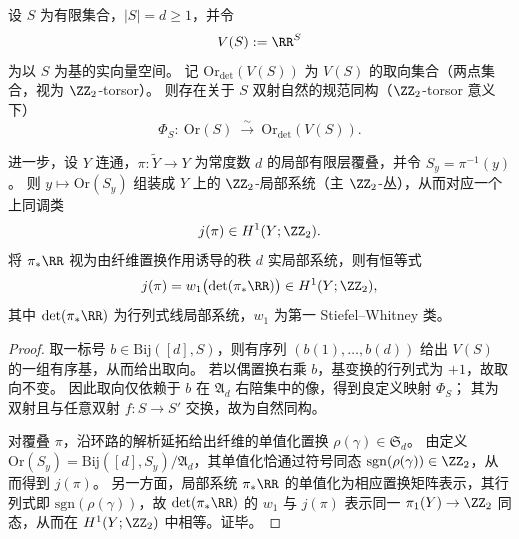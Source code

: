 \begin{proposition}\label{prop:bdry-orientation-torsor-determinant-realization-jumpclass}
设 \(S\) 为有限集合，\(|S|=d\ge 1\)，并令
\[
V(S):=\RR^{S}
\]
为以 \(S\) 为基的实向量空间。
记 \(\mathrm{Or}_{\det}(V(S))\) 为 \(V(S)\) 的取向集合（两点集合，视为 \(\ZZ_2\)-torsor）。
则存在关于 \(S\) 双射自然的规范同构（\(\ZZ_2\)-torsor 意义下）
\[
\Phi_S:\ \mathrm{Or}(S)\ \xrightarrow{\ \sim\ }\ \mathrm{Or}_{\det}(V(S)).
\]
\par
进一步，设 \(Y\) 连通，\(\pi:\widetilde Y\to Y\) 为常度数 \(d\) 的局部有限层覆叠，并令 \(S_y=\pi^{-1}(y)\)。
则 \(y\mapsto \mathrm{Or}(S_y)\) 组装成 \(Y\) 上的 \(\ZZ_2\)-局部系统（主 \(\ZZ_2\)-丛），从而对应一个上同调类
\[
j(\pi)\in H^1(Y;\ZZ_2).
\]
将 \(\pi_\ast\RR\) 视为由纤维置换作用诱导的秩 \(d\) 实局部系统，则有恒等式
\[
j(\pi)=w_1\bigl(\det(\pi_\ast\RR)\bigr)\in H^1(Y;\ZZ_2),
\]
其中 \(\det(\pi_\ast\RR)\) 为行列式线局部系统，\(w_1\) 为第一 Stiefel--Whitney 类。
\end{proposition}
\begin{proof}
取一标号 \(b\in\mathrm{Bij}([d],S)\)，则有序列 \((b(1),\dots,b(d))\) 给出 \(V(S)\) 的一组有序基，从而给出取向。
若以偶置换右乘 \(b\)，基变换的行列式为 \(+1\)，故取向不变。
因此取向仅依赖于 \(b\) 在 \(\mathfrak A_d\) 右陪集中的像，得到良定义映射 \(\Phi_S\)；
其为双射且与任意双射 \(f:S\to S'\) 交换，故为自然同构。
\par
对覆叠 \(\pi\)，沿环路的解析延拓给出纤维的单值化置换 \(\rho(\gamma)\in\mathfrak S_d\)。
由定义 \(\mathrm{Or}(S_y)=\mathrm{Bij}([d],S_y)/\mathfrak A_d\)，其单值化恰通过符号同态 \(\mathrm{sgn}(\rho(\gamma))\in\ZZ_2\)，从而得到 \(j(\pi)\)。
另一方面，局部系统 \(\pi_\ast\RR\) 的单值化为相应置换矩阵表示，其行列式即 \(\mathrm{sgn}(\rho(\gamma))\)，故 \(\det(\pi_\ast\RR)\) 的 \(w_1\) 与 \(j(\pi)\) 表示同一 \(\pi_1(Y)\to\ZZ_2\) 同态，从而在 \(H^1(Y;\ZZ_2)\) 中相等。证毕。
\end{proof}

